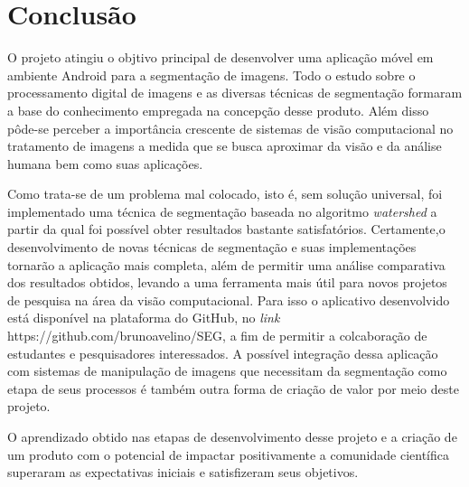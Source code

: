 \chapter{Conclusão}\label{cap:conclusao}

O projeto atingiu o objtivo principal de desenvolver uma aplicação móvel em ambiente Android para a segmentação de imagens. Todo o estudo sobre o processamento digital de imagens e as diversas técnicas de segmentação formaram a base do conhecimento empregada na concepção desse produto. Além disso pôde-se perceber a importância crescente de sistemas de visão computacional no tratamento de imagens a medida que se busca aproximar da visão e da análise humana bem como suas aplicações.

Como trata-se de um problema mal colocado, isto é, sem solução universal, foi implementado uma técnica de segmentação baseada no algoritmo \textit{watershed} a partir da qual foi possível obter resultados bastante satisfatórios. Certamente,o desenvolvimento de novas técnicas de segmentação e suas implementações tornarão a aplicação mais completa, além de permitir uma análise comparativa dos resultados obtidos, levando a uma ferramenta mais útil para novos projetos de pesquisa na área da visão computacional. Para isso o aplicativo desenvolvido está disponível na plataforma do GitHub, no \textit{link} https://github.com/brunoavelino/SEG, a fim de permitir a colcaboração de estudantes e pesquisadores interessados. A possível integração dessa aplicação com sistemas de manipulação de imagens que necessitam da segmentação como etapa de seus processos é também outra forma de criação de valor por meio deste projeto.

O aprendizado obtido nas etapas de desenvolvimento desse projeto e a criação de um produto com o potencial de impactar positivamente a comunidade científica superaram as expectativas iniciais e satisfizeram seus objetivos.


